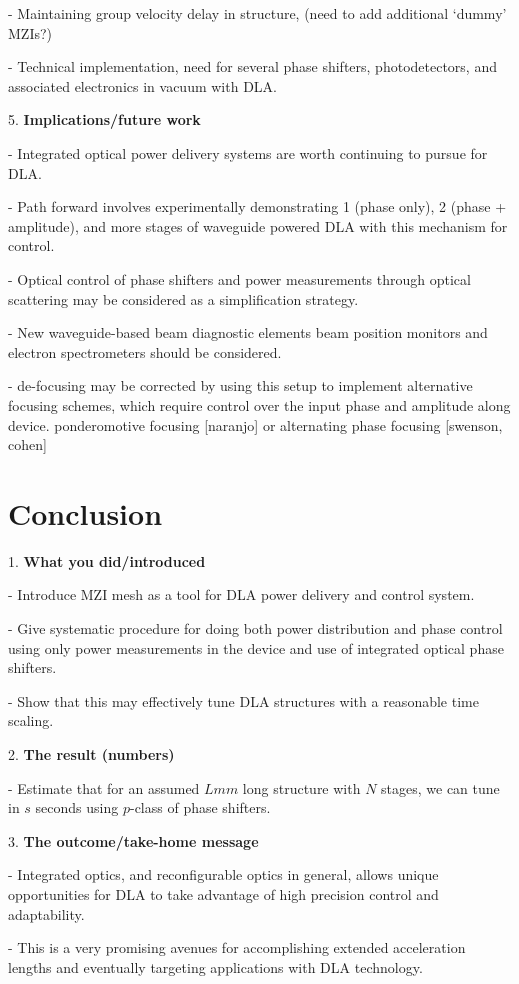 \documentclass[%
 reprint,
 amsmath,amssymb,
 aps,
prstab,
floatfix,
]{revtex4-1}
\begin{document}
- Maintaining group velocity delay in structure, (need to add additional `dummy' MZIs?)

- Technical implementation, need for several phase shifters, photodetectors, and associated electronics in vacuum with DLA.

5. \textbf{Implications/future work}

- Integrated optical power delivery systems are worth continuing to pursue for DLA.

- Path forward involves experimentally demonstrating 1 (phase only), 2 (phase + amplitude), and more stages of waveguide powered DLA with this mechanism for control.

- Optical control of phase shifters and power measurements through optical scattering may be considered as a simplification strategy.

- New waveguide-based beam diagnostic elements beam position monitors and electron spectrometers should be considered.

- de-focusing may be corrected by using this setup to implement alternative focusing schemes, which require control over the input phase and amplitude along device. ponderomotive focusing [naranjo] or alternating phase focusing [swenson, cohen]

\section{\label{sec:conclusion}Conclusion}
1. \textbf{What you did/introduced}

- Introduce MZI mesh as a tool for DLA power delivery and control system.

- Give systematic procedure for doing both power distribution and phase control using only power measurements in the device and use of integrated optical phase shifters.

- Show that this may effectively tune DLA structures with a reasonable time scaling.

2. \textbf{The result (numbers)}

- Estimate that for an assumed $L mm$ long structure with $N$ stages, we can tune in $s$ seconds using $p$-class of phase shifters.

3. \textbf{The outcome/take-home message}

- Integrated optics, and reconfigurable optics in general, allows unique opportunities for DLA to take advantage of high precision control and adaptability.

- This is a very promising avenues for accomplishing extended acceleration lengths and eventually targeting applications with DLA technology.
\end{document}
